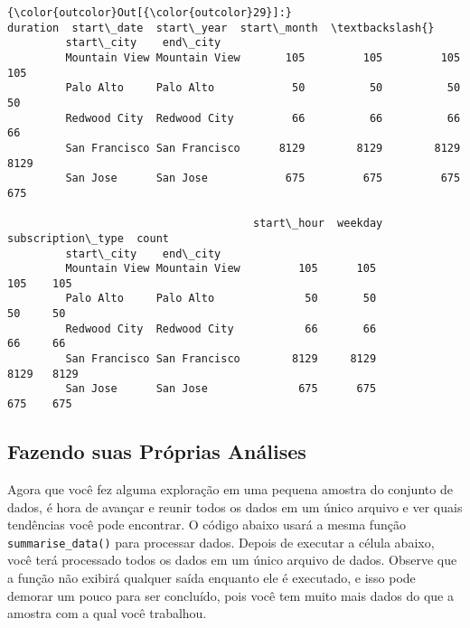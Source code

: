 \documentclass[11pt]{article}
\begin{document}
\begin{Verbatim}[commandchars=\\\{\}]
{\color{outcolor}Out[{\color{outcolor}29}]:}                              duration  start\_date  start\_year  start\_month  \textbackslash{}
         start\_city    end\_city                                                       
         Mountain View Mountain View       105         105         105          105   
         Palo Alto     Palo Alto            50          50          50           50   
         Redwood City  Redwood City         66          66          66           66   
         San Francisco San Francisco      8129        8129        8129         8129   
         San Jose      San Jose            675         675         675          675   
         
                                      start\_hour  weekday  subscription\_type  count  
         start\_city    end\_city                                                      
         Mountain View Mountain View         105      105                105    105  
         Palo Alto     Palo Alto              50       50                 50     50  
         Redwood City  Redwood City           66       66                 66     66  
         San Francisco San Francisco        8129     8129               8129   8129  
         San Jose      San Jose              675      675                675    675  
\end{Verbatim}
            
    \subsection{Fazendo suas Próprias
Análises}\label{fazendo-suas-pruxf3prias-anuxe1lises}

Agora que você fez alguma exploração em uma pequena amostra do conjunto
de dados, é hora de avançar e reunir todos os dados em um único arquivo
e ver quais tendências você pode encontrar. O código abaixo usará a
mesma função \texttt{summarise\_data()} para processar dados. Depois de
executar a célula abaixo, você terá processado todos os dados em um
único arquivo de dados. Observe que a função não exibirá qualquer saída
enquanto ele é executado, e isso pode demorar um pouco para ser
concluído, pois você tem muito mais dados do que a amostra com a qual
você trabalhou.
\end{document}
